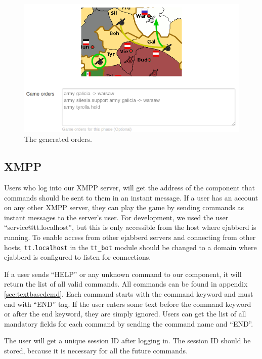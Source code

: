 \documentclass[11pt,a4paper]{report}
\begin{document}
\begin{figure}[h]
 \centering
 \includegraphics[width=\textwidth]{./graphics/orderssmall.png}
 \caption{The generated orders.}
 \label{fig:orders}
\end{figure}

\subsection{XMPP}
Users who log into our XMPP server, will get the address of the component that
commands should be sent to them in an instant message. If a user has an account
on any other XMPP server, they can play the game by sending commands as instant
messages to the server's user. For development, we used the user
``service@tt.localhost'', but this is only accessible from the host where ejabberd
is running. To enable access from other ejabberd servers and connecting from
other hosts, {\tt tt.localhost} in the {\tt tt\_bot} module should be changed to
a domain where ejabberd is configured to listen for connections.

If a user sends  ``HELP'' or any unknown command to our component, it will
return the list of all valid commands. All commands can be found in appendix
\ref{sec:textbasedcmd}.
Each command starts with the command keyword and must end with ``END'' tag.
If the user enters some text before the command keyword or after the end
keyword, they are simply ignored. Users can get the list of all mandatory fields
for each command by sending the command name and ``END''.

The user will get a unique session ID after logging in. The session ID should be
stored, because it is necessary for all the future commands.
\end{document}
